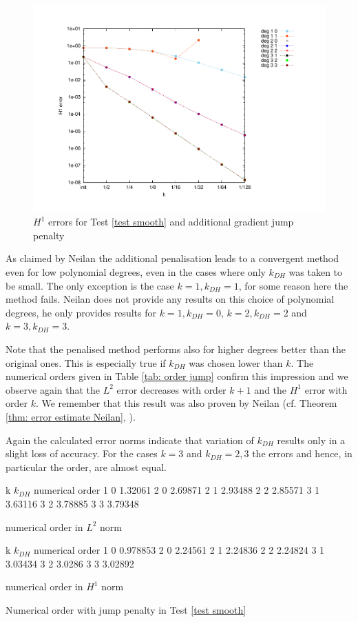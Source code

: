 \begin{figure}[H]
\centering
	\includegraphics[scale =0.45]{plots/MA1_Neilan_GradJump_h1.pdf}
	\caption{$H^1$ errors for Test \ref{test smooth} and additional gradient jump penalty}
	\label{fig: h1 errors test 1 jump}
\end{figure}

As claimed by Neilan the additional penalisation leads to a convergent method even for low polynomial degrees, even in the cases where only $k_{DH}$ was taken to be small. The only exception is the case $k=1, k_{DH}=1$, for some reason here the method fails. Neilan does not provide any results on this choice of polynomial degrees, he only provides results for $k=1, k_{DH}=0$, $k=2, k_{DH}=2$ and $k=3, k_{DH}=3$. 

Note that the penalised method performs also for higher degrees better than the original ones. This is especially true if $k_{DH}$ was chosen lower than $k$. The numerical orders given in Table \ref{tab: order jump} confirm this impression and we observe again that the $L^2$ error decreases with order $k+1$ and the $H^1$ error with order $k$. We remember that this result was also proven by Neilan (cf. Theorem \ref{thm: error estimate Neilan}, \cite[Theorem 4.2.]{Neilan2014}).

Again the calculated error norms indicate that variation of $k_{DH}$ results only in a slight loss of accuracy. For the cases $k=3$ and $k_{DH} = 2,3$ the errors and hence, in particular the order, are almost equal. 


\begin{table}[H]
\centering
\begin{subtable}[b]{0.45\textwidth}
	\pgfplotstabletypeset
	{
		k $k_{DH}$ {numerical order}
		1 0 1.32061
		2 0 2.69871
		2 1 2.93488
		2 2 2.85571
		3 1 3.63116 
		3 2 3.78885
		3 3 3.79348
	}
	\caption{numerical order in $L^2$ norm}
	\end{subtable}
	\begin{subtable}[b]{0.45\textwidth}
	\pgfplotstabletypeset
	{
		k $k_{DH}$ {numerical order}
		1 0 0.978853
		2 0 2.24561
		2 1 2.24836
		2 2 2.24824
		3 1 3.03434
		3 2 3.0286
		3 3 3.02892
	}
	\caption{numerical order in $H^1$ norm}
	\end{subtable}
	\caption{Numerical order with jump penalty in Test \ref{test smooth}}
\label{tab: order jump}
\end{table}

